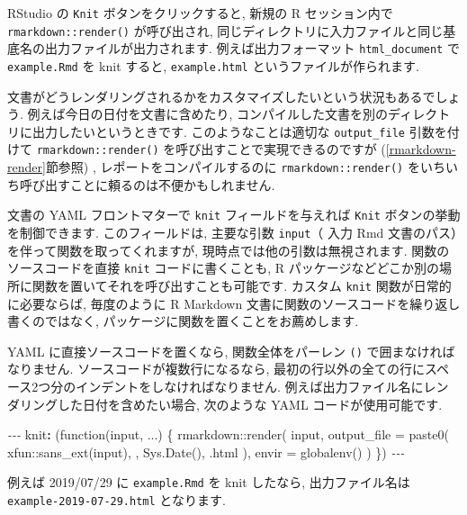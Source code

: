 \documentclass[
  11pt,
  lualatex,ja=standard,jafont=noto]{bxjsreport}
\newenvironment{Shaded}{\begin{snugshade}}{\end{snugshade}}
\newcommand{\AttributeTok}[1]{\textcolor[rgb]{0.77,0.63,0.00}{#1}}
\newcommand{\FunctionTok}[1]{\textcolor[rgb]{0.00,0.00,0.00}{#1}}
\newcommand{\KeywordTok}[1]{\textcolor[rgb]{0.13,0.29,0.53}{\textbf{#1}}}
\newcommand{\PreprocessorTok}[1]{\textcolor[rgb]{0.56,0.35,0.01}{\textit{#1}}}
\begin{document}
RStudio の \texttt{Knit} ボタンをクリックすると, 新規の R セッション内で \texttt{rmarkdown::render()} が呼び出され, 同じディレクトリに入力ファイルと同じ基底名の出力ファイルが出力されます. 例えば出力フォーマット \texttt{html\_document} で \texttt{example.Rmd} を knit すると, \texttt{example.html} というファイルが作られます.

文書がどうレンダリングされるかをカスタマイズしたいという状況もあるでしょう. 例えば今日の日付を文書に含めたり, コンパイルした文書を別のディレクトリに出力したいというときです. このようなことは適切な \texttt{output\_file} 引数を付けて \texttt{rmarkdown::render()} を呼び出すことで実現できるのですが (\ref{rmarkdown-render}節参照) , レポートをコンパイルするのに \texttt{rmarkdown::render()} をいちいち呼び出すことに頼るのは不便かもしれません.

文書の YAML フロントマターで \texttt{knit} フィールドを与えれば \texttt{Knit} ボタンの挙動を制御できます. このフィールドは, 主要な引数 \texttt{input}（ 入力 Rmd 文書のパス）を伴って関数を取ってくれますが, 現時点では他の引数は無視されます. 関数のソースコードを直接 \texttt{knit} コードに書くことも, R パッケージなどどこか別の場所に関数を置いてそれを呼び出すことも可能です. カスタム \texttt{knit} 関数が日常的に必要ならば, 毎度のように R Markdown 文書に関数のソースコードを繰り返し書くのではなく, パッケージに関数を置くことをお薦めします.

YAML に直接ソースコードを置くなら, 関数全体をパーレン \texttt{()} で囲まなければなりません. ソースコードが複数行になるなら, 最初の行以外の全ての行にスペース2つ分のインデントをしなければなりません. 例えば出力ファイル名にレンダリングした日付を含めたい場合, 次のような YAML コードが使用可能です.

\begin{Shaded}
\begin{Highlighting}[]
\PreprocessorTok{{-}{-}{-}}
\FunctionTok{knit}\KeywordTok{:}\AttributeTok{ (function(input, ...) \{}
\AttributeTok{    rmarkdown::render(}
\AttributeTok{      input,}
\AttributeTok{      output\_file = paste0(}
\AttributeTok{        xfun::sans\_ext(input), \textquotesingle{}{-}\textquotesingle{}, Sys.Date(), \textquotesingle{}.html\textquotesingle{}}
\AttributeTok{      ),}
\AttributeTok{      envir = globalenv()}
\AttributeTok{    )}
\AttributeTok{  \})}
\PreprocessorTok{{-}{-}{-}}
\end{Highlighting}
\end{Shaded}

例えば 2019/07/29 に \texttt{example.Rmd} を knit したなら, 出力ファイル名は \texttt{example-2019-07-29.html} となります.
\end{document}
